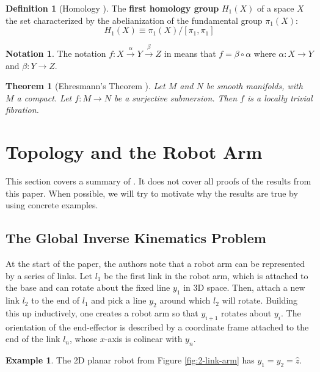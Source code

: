 \documentclass[12pt]{article}
\newtheorem{thm}{Theorem}
\theoremstyle{definition}
\newtheorem{defn}{Definition}
\newtheorem{example}{Example}
\newtheorem*{notation}{Notation}
\begin{document}
\begin{defn}[Homology \cite{topology-fiber-bundles}]
    The \textbf{first homology group} \(H_1(X)\) of a space \(X\) the set
    characterized by the  abelianization of the fundamental group \(\pi_1(X)\):
    \[
        H_1(X) \equiv \pi_1(X)/[\pi_1,\pi_1]
    \]
\end{defn}

\begin{notation}
    The notation
    \(f : X \xrightarrow{\alpha} Y \xrightarrow{\beta} Z\)
    in \cite{topology-robot-arm} means that \(f = \beta \circ \alpha\) where
    \(\alpha : X \rightarrow Y\) and \(\beta : Y \rightarrow Z\).
\end{notation}

\begin{thm}[Ehresmann's Theorem \cite{ehresmann}]
    Let \(M\) and \(N\) be smooth manifolds, with \(M\) a compact. 
    Let \(f : M \rightarrow N\) be a surjective submersion. Then \(f\) is a
    locally trivial fibration.
\end{thm}

\section{Topology and the Robot Arm}
This section covers a summary of \cite{topology-robot-arm}. It does not cover
all proofs of the results from this paper. When possible, we
will try to motivate why the results are true by using concrete examples.

\subsection{The Global Inverse Kinematics Problem}
At the start of the paper, the authors note that a robot arm can be represented
by a series of links. Let \(l_1\) be the first link in the robot arm, which is
attached to the base and can rotate about the fixed line \(y_1\) in 3D space.
Then, attach a new link \(l_2\) to the end of \(l_1\) and pick a line \(y_2\)
around which \(l_2\) will rotate. Building this up inductively, one creates a
robot arm so that \(y_{i+1}\) rotates about \(y_i\). The orientation of the
end-effector is described by a coordinate frame attached to the end of the link
\(l_n\), whose \(x\)-axis is colinear with \(y_n\).

\begin{example}
    The 2D planar robot from Figure \ref{fig:2-link-arm} has 
    \(y_1 = y_2 = \hat{z}\).
\end{example}
\end{document}

